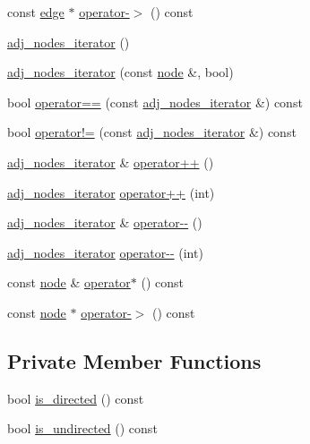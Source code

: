 \begin{DoxyCompactItemize}
\item 
const \mbox{\hyperlink{classedge}{edge}} $\ast$ \mbox{\hyperlink{classnode_a71b168f27cc7338906814f6a3ecc176f}{operator-\/$>$}} () const
\item 
\mbox{\hyperlink{classnode_a392f19ea6dfa344bdf5c4d5a4b25eb8c}{adj\+\_\+nodes\+\_\+iterator}} ()
\item 
\mbox{\hyperlink{classnode_ade9ca1b2c63a0467be176756545b3c2c}{adj\+\_\+nodes\+\_\+iterator}} (const \mbox{\hyperlink{classnode}{node}} \&, bool)
\item 
bool \mbox{\hyperlink{classnode_abe20131c7427c6f045ab4c23916efa3c}{operator==}} (const \mbox{\hyperlink{classnode_a392f19ea6dfa344bdf5c4d5a4b25eb8c}{adj\+\_\+nodes\+\_\+iterator}} \&) const
\item 
bool \mbox{\hyperlink{classnode_abfcd7e8ce1391bd60f155a5de47419c5}{operator!=}} (const \mbox{\hyperlink{classnode_a392f19ea6dfa344bdf5c4d5a4b25eb8c}{adj\+\_\+nodes\+\_\+iterator}} \&) const
\item 
\mbox{\hyperlink{classnode_a392f19ea6dfa344bdf5c4d5a4b25eb8c}{adj\+\_\+nodes\+\_\+iterator}} \& \mbox{\hyperlink{classnode_a5c9569e6719a8bebd6dd78266a0da533}{operator++}} ()
\item 
\mbox{\hyperlink{classnode_a392f19ea6dfa344bdf5c4d5a4b25eb8c}{adj\+\_\+nodes\+\_\+iterator}} \mbox{\hyperlink{classnode_af12ab69bcd07d4d41052b50801690520}{operator++}} (int)
\item 
\mbox{\hyperlink{classnode_a392f19ea6dfa344bdf5c4d5a4b25eb8c}{adj\+\_\+nodes\+\_\+iterator}} \& \mbox{\hyperlink{classnode_abd4b60efd003b18db13d9fde0a25f91a}{operator-\/-\/}} ()
\item 
\mbox{\hyperlink{classnode_a392f19ea6dfa344bdf5c4d5a4b25eb8c}{adj\+\_\+nodes\+\_\+iterator}} \mbox{\hyperlink{classnode_ae7cdb2be553782c2dcf48c6ec8ef9d67}{operator-\/-\/}} (int)
\item 
const \mbox{\hyperlink{classnode}{node}} \& \mbox{\hyperlink{classnode_a59fdf9aff393a47b4c60c3f21a4ccbc8}{operator$\ast$}} () const
\item 
const \mbox{\hyperlink{classnode}{node}} $\ast$ \mbox{\hyperlink{classnode_a82d46c8753db26b34382fcfd9f887c12}{operator-\/$>$}} () const
\end{DoxyCompactItemize}
\subsection*{Private Member Functions}
\begin{DoxyCompactItemize}
\item 
bool \mbox{\hyperlink{classnode_a4937028da2c9035228b761347eaa6503}{is\+\_\+directed}} () const
\item 
bool \mbox{\hyperlink{classnode_a4af4fd2f8efa1f98369585862077e1a9}{is\+\_\+undirected}} () const
\end{DoxyCompactItemize}
